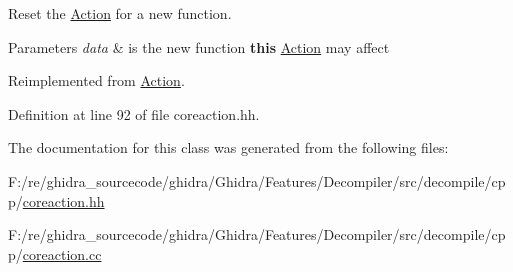 Reset the \mbox{\hyperlink{class_action}{Action}} for a new function. 


\begin{DoxyParams}{Parameters}
{\em data} & is the new function {\bfseries{this}} \mbox{\hyperlink{class_action}{Action}} may affect \\
\hline
\end{DoxyParams}


Reimplemented from \mbox{\hyperlink{class_action_ac7c1cf16bb63e0741ba16be5179cf943}{Action}}.



Definition at line 92 of file coreaction.\+hh.



The documentation for this class was generated from the following files\+:\begin{DoxyCompactItemize}
\item 
F\+:/re/ghidra\+\_\+sourcecode/ghidra/\+Ghidra/\+Features/\+Decompiler/src/decompile/cpp/\mbox{\hyperlink{coreaction_8hh}{coreaction.\+hh}}\item 
F\+:/re/ghidra\+\_\+sourcecode/ghidra/\+Ghidra/\+Features/\+Decompiler/src/decompile/cpp/\mbox{\hyperlink{coreaction_8cc}{coreaction.\+cc}}\end{DoxyCompactItemize}
